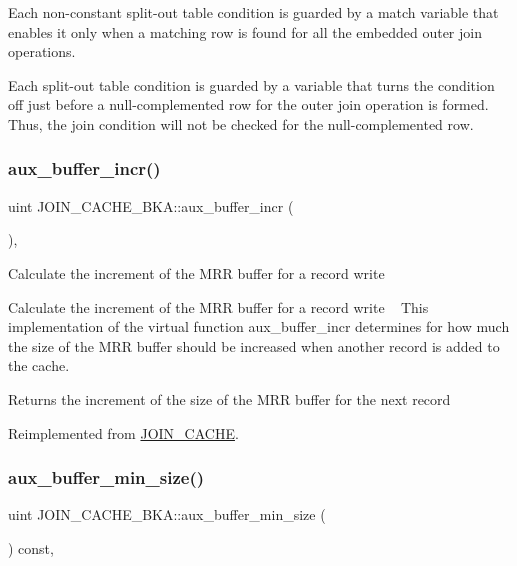 Each non-\/constant split-\/out table condition is guarded by a match variable that enables it only when a matching row is found for all the embedded outer join operations.

Each split-\/out table condition is guarded by a variable that turns the condition off just before a null-\/complemented row for the outer join operation is formed. Thus, the join condition will not be checked for the null-\/complemented row. \mbox{\label{group__Query__Optimizer_ga8661280e3da40b2c581ec758c50e1979}} 
\subsubsection{\texorpdfstring{aux\+\_\+buffer\+\_\+incr()}{aux\_buffer\_incr()}}
{\footnotesize\ttfamily uint J\+O\+I\+N\+\_\+\+C\+A\+C\+H\+E\+\_\+\+B\+K\+A\+::aux\+\_\+buffer\+\_\+incr (\begin{DoxyParamCaption}{ }\end{DoxyParamCaption})\hspace{0.3cm}{\ttfamily [protected]}, {\ttfamily [virtual]}}

Calculate the increment of the M\+RR buffer for a record write

Calculate the increment of the M\+RR buffer for a record write ~\newline
 This implementation of the virtual function aux\+\_\+buffer\+\_\+incr determines for how much the size of the M\+RR buffer should be increased when another record is added to the cache.

\begin{DoxyReturn}{Returns}
the increment of the size of the M\+RR buffer for the next record 
\end{DoxyReturn}


Reimplemented from \mbox{\hyperlink{classJOIN__CACHE}{J\+O\+I\+N\+\_\+\+C\+A\+C\+HE}}.

\mbox{\label{group__Query__Optimizer_gaef7343f0416360c14c6134867b347c83}} 
\subsubsection{\texorpdfstring{aux\+\_\+buffer\+\_\+min\+\_\+size()}{aux\_buffer\_min\_size()}}
{\footnotesize\ttfamily uint J\+O\+I\+N\+\_\+\+C\+A\+C\+H\+E\+\_\+\+B\+K\+A\+::aux\+\_\+buffer\+\_\+min\+\_\+size (\begin{DoxyParamCaption}{ }\end{DoxyParamCaption}) const\hspace{0.3cm}{\ttfamily [protected]}, {\ttfamily [virtual]}}

